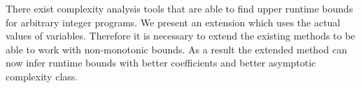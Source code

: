 
There exist complexity analysis tools that are able to find upper runtime bounds for arbitrary integer programs.
We present an extension which uses the actual values of variables.
Therefore it is necessary to extend the existing methods to be able to work with non-monotonic bounds.
As a result the extended method can now infer runtime bounds with better coefficients and better asymptotic complexity class. 
